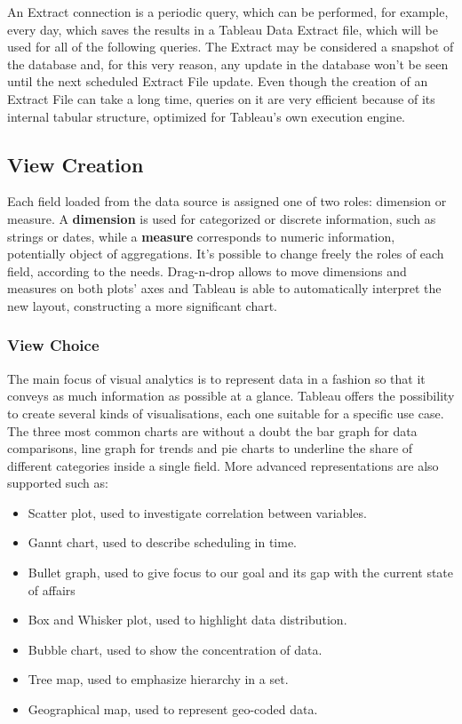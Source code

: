 An Extract connection is a periodic query, which can be performed, for example, every day, which saves the results in a Tableau Data Extract file, which will be used for all of the following queries. The Extract may be considered a snapshot of the database and, for this very reason, any update in the database won't be seen until the next scheduled Extract File update. Even though the creation of an Extract File can take a long time, queries on it are very efficient because of its internal tabular structure, optimized for Tableau's own execution engine.

\subsection{View Creation}

Each field loaded from the data source is assigned one of two roles: dimension or measure. A \textbf{dimension} is used for categorized or discrete information, such as strings or dates, while a \textbf{measure} corresponds to numeric information, potentially object of aggregations. It's possible to change freely the roles of each field, according to the needs. Drag-n-drop allows to move dimensions and measures on both plots' axes and Tableau is able to automatically interpret the new layout, constructing a more significant chart.

\subsubsection{View Choice}
The main focus of visual analytics is to represent data in a fashion so that it conveys as much information as possible at a glance.
Tableau offers the possibility to create several kinds of visualisations, each one suitable for a specific use case. The three most common charts are without a doubt the bar graph for data comparisons, line graph for trends and pie charts to underline the share of different categories inside a single field.
More advanced representations are also supported such as:

\begin{itemize}
	\item Scatter plot, used to investigate correlation between variables.
	\item Gannt chart, used to describe scheduling in time.
	\item Bullet graph, used to give focus to our goal and its gap with the current state of affairs
	\item Box and Whisker plot, used to highlight data distribution.
	\item Bubble chart, used to show the concentration of data.
	\item Tree map, used to emphasize hierarchy in a set.
	\item Geographical map, used to represent geo-coded data.
\end{itemize} 

